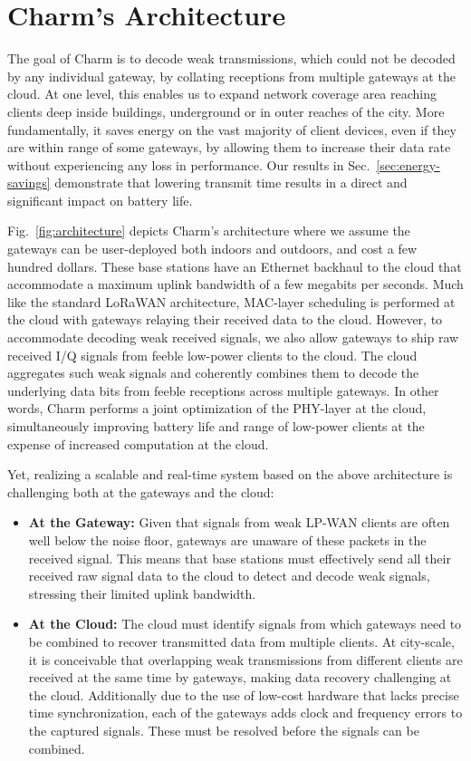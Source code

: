 \section{Charm's Architecture}
\label{sec:arch}

The goal of Charm is to decode weak transmissions, which could not be decoded
by any individual gateway, by collating receptions from multiple gateways at
the cloud. At one level, this  enables us to expand network coverage area
reaching clients deep inside buildings, underground or in outer reaches of the
city. More fundamentally, it saves energy on the vast majority of client
devices, even if they are within range of some gateways, by allowing them to
increase their data rate without experiencing any loss in performance. Our
results in Sec.~\ref{sec:energy-savings} demonstrate that lowering transmit
time results in a direct and significant impact on battery life.

Fig.~\ref{fig:architecture} depicts Charm's architecture where we assume the
gateways can be user-deployed  both indoors and outdoors, and cost a few
hundred dollars. These base stations have an Ethernet backhaul to the cloud
that accommodate a maximum uplink bandwidth of a few megabits per seconds.
Much like the standard LoRaWAN architecture, MAC-layer scheduling is performed
at the cloud with gateways relaying their received data to the cloud. However,
to accommodate decoding weak received signals, we also allow gateways to ship
raw received I/Q signals from feeble low-power clients to the cloud. The cloud
aggregates such weak signals and coherently combines them to decode the
underlying data bits from feeble receptions across multiple gateways. In other
words, Charm performs a joint optimization of the  PHY-layer at the cloud,
simultaneously improving battery life and range of low-power clients at the
expense of increased computation at the cloud.

Yet, realizing a scalable and real-time system based on the above architecture
is challenging both at the gateways and the cloud:
\begin{itemize}
\item {\bf At the Gateway: } Given that signals from weak LP-WAN
clients are often well below the noise floor, gateways are unaware of these
packets in the received signal. This means that base stations must effectively
send all their received raw signal data to the cloud to detect and decode weak
signals, stressing their limited uplink bandwidth.
\item {\bf At the Cloud: } The cloud must identify signals from which
gateways need to be combined to recover transmitted data from multiple
clients. At city-scale, it is conceivable that overlapping weak transmissions
from different clients are received at the same time by gateways, making data
recovery challenging at the cloud. Additionally due to the use of low-cost
hardware that lacks precise time synchronization, each of the gateways adds
clock and frequency errors to the captured signals. These must be resolved
before the signals can be combined.
\end{itemize}


